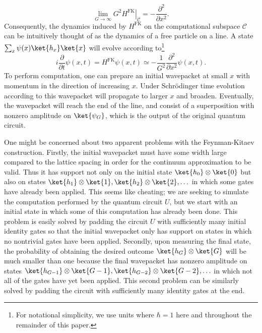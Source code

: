 \documentclass[11pt]{article}
\begin{document}
\begin{equation}
\lim_{G \to \infty} G^2 \left. H^{\mathrm{FK}} \right|_{\mathcal{C}}  = -\frac{\partial^2}{\partial x^2}.
\end{equation}
Consequently, the dynamics induced by $H^{\mathrm{FK}}$ on the computational subspace $\mathcal{C}$ can be intuitively thought of as the dynamics of a free particle on a line. A state $\sum_x \psi(x) \ket{h_x} \ket{x}$ will evolve according to\footnote{For notational simplicity, we use units where $\hbar = 1$ here and throughout the remainder of this paper.}
\begin{equation}
\label{line}
i \frac{\partial}{\partial t} \psi(x,t) = H^{\mathrm{FK}} \psi(x,t) \simeq -\frac{1}{G^2} \frac{\partial^2}{\partial x^2} \psi(x,t).
\end{equation}
To perform computation, one can prepare an initial wavepacket at small $x$ with momentum in the direction of increasing $x$. Under Schr{\"o}dinger time evolution according to  this wavepacket will propagate to larger $x$ and broaden. Eventually, the wavepacket will reach the end of the line, and consist of a superposition with nonzero amplitude on $\ket{\psi_G}$, which is the output of the original quantum circuit.

One might be concerned about two apparent problems with the Feynman-Kitaev construction. Firstly, the initial wavepacket must have some width large compared to the lattice spacing in order for the continuum approximation to be valid. Thus it has support not only on the initial state $\ket{h_0} \otimes \ket{0}$ but also on states $\ket{h_1} \otimes \ket{1}, \ket{h_2} \otimes \ket{2},\ldots$ in which some gates have already been applied. This seems like cheating; we are seeking to simulate the computation performed by the quantum circuit $U$, but we start with an initial state in which some of this computation has already been done. This problem is easily solved by padding the circuit $U$ with sufficiently many initial identity gates so that the initial wavepacket only has support on states in which no nontrivial gates have been applied. Secondly, upon measuring the final state, the probability of obtaining the desired outcome $\ket{h_G} \otimes \ket{G}$ will be much smaller than one because the final wavepacket has nonzero amplitude on states $\ket{h_{G-1}} \otimes \ket{G-1}, \ket{h_{G-2}} \otimes \ket{G-2},\ldots$ in which not all of the gates have yet been applied. This second problem can be similarly solved by padding the circuit with sufficiently many identity gates at the end.
\end{document}
